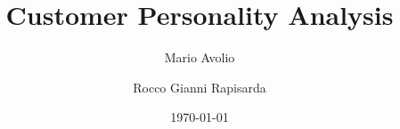 \title[Customer Personality Analysis]%
{\Huge Customer Personality Analysis}


\author[Mario Avolio \and Rocco Gianni Rapisarda]%
{Mario Avolio \and
  Rocco Gianni Rapisarda}



\institute[DISCo]%
{
  \small Università Milano Bicocca - Dipartimento di Informatica Sistemistica e Comunicazione
}

\date[]{\today}

\subject{Report by Mario Avolio, Rocco Gianni Rapisarda}%

